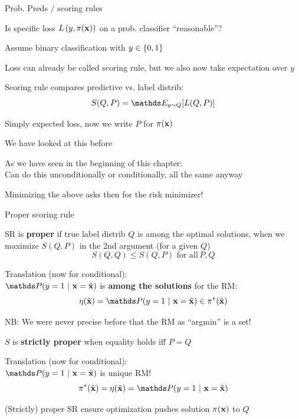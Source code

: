 \documentclass[11pt,compress,t,notes=noshow, xcolor=table]{beamer}
\begin{document}
    

\begin{framei}[sep=M]{Prob. Preds / scoring rules }

\item Is specific loss $L\left(y, \pi(\mathbf{x})\right)$ on a prob. classifier ``reasonable''?
\item Assume binary classification with $y \in \{0, 1\}$
\item Loss can already be called scoring rule, but we also now take expectation over $y$
\item Scoring rule compares predictive vs. label distrib: 
$$ S(Q, P) = \E_{y \sim Q}[L(Q, P)]$$
\item Simply expected loss, now we write $P$ for $\pi(\mathbf{x})$
\item We have looked at this before
\item As we have seen in the beginning of this chapter:\\ 
Can do this unconditionally or conditionally, all the same anyway
\item Minimizing the above asks then for the risk minimizer!


\end{framei}

\begin{framei}[sep=M]{Proper scoring rule }

\item SR is \textbf{proper} if true label distrib $Q$ is among the optimal 
solutions, when we maximize $S(Q, P)$ in the 2nd argument (for a given $Q$)
$$S(Q,Q) \leq S(Q, P) \,\, \text{for all} \, P,Q $$

\item Translation (now for conditional): \\
$\P(y = 1 ~|~ \xv = \xtil)$ is \textbf{among the solutions} for the RM: 
$$
   \eta(\xtil) = \P(y = 1 ~|~ \xv = \xtil) \in \piastxtil
$$

\item NB: We were never precise before that the RM as ``argmin'' is a set!

\item $S$ is \textbf{strictly proper} when equality holds iff $P=Q$

\item Translation (now for conditional): \\
$\P(y = 1 ~|~ \xv = \xtil)$ is unique RM! 
$$
   \piastxtil = \eta(\xtil) = \P(y = 1 ~|~ \xv = \xtil)
$$

\item (Strictly) proper SR ensure optimization pushes solution $\pi(\mathbf{x})$ to $Q$ 


\end{framei}
\end{document}
